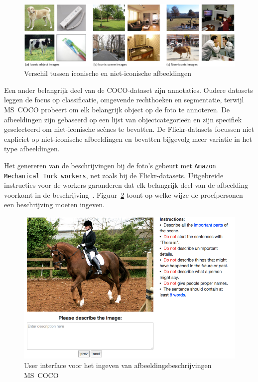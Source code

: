 \begin{figure}[tb]
	\centering
	\includegraphics[width=\linewidth]{Images/iconic.jpg}
	\caption[Verschil tussen iconische en niet-iconische afbeeldingen]{Verschil tussen iconische en niet-iconische afbeeldingen~\cite{Lin2014}}
	\label{fig:cocotypes}
\end{figure}

Een ander belangrijk deel van de COCO-dataset zijn annotaties. Oudere datasets leggen de focus op classificatie, omgevende rechthoeken en segmentatie, terwijl \mbox{MS COCO} probeert om elk belangrijk object op de foto te annoteren. De afbeeldingen zijn gebaseerd op een lijst van objectcategorie\"en en zijn specifiek geselecteerd om niet-iconische sc\`enes te bevatten. De Flickr-datasets focussen niet expliciet op niet-iconische afbeeldingen en bevatten bijgevolg meer variatie in het type afbeeldingen.

Het genereren van de beschrijvingen bij de foto's gebeurt met \texttt{Amazon Mechanical Turk workers}, net zoals bij de Flickr-datasets. Uitgebreide instructies voor de workers garanderen dat elk belangrijk deel van de afbeelding voorkomt in de beschrijving~\cite{Rampf2015}. Figuur~\ref{fig:coco_ui} toont op welke wijze de proefpersonen een beschrijving moeten ingeven.

\begin{figure}[tb]
	\centering
	\includegraphics[width=0.8\linewidth]{Images/coco_UI.png}
	\caption[User interface voor het ingeven van afbeeldingsbeschrijvingen \mbox{MS COCO}]{User interface voor het ingeven van afbeeldingsbeschrijvingen \mbox{MS COCO}~\cite{Rampf2015}}
	\label{fig:coco_ui}
\end{figure}

